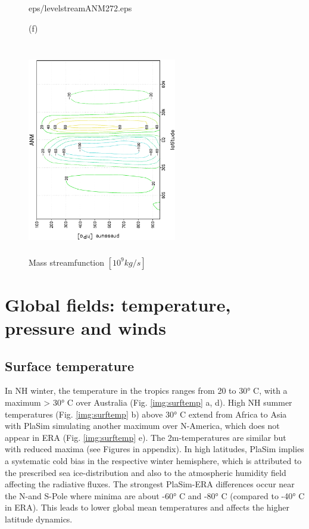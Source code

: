 \documentclass[12pt,a4paper,twoside,openright,headinclude,liststotoc,bibtotoc]{scrreprt}
\begin{document}
\begin{figure}[H]
{{eps/levelstreamANM272.eps}
}
\parbox{8.5cm}{\hspace{1.05cm}\begin{scriptsize}(f)\end{scriptsize} \vspace{-0.5cm} \\
\includegraphics[height=8.5cm,width=6.5cm,angle=-90]
{eps/t21levelstreamANM272.eps}
}
\caption[Mass streamfunction]{Mass streamfunction $[10^{9}kg/s]$}
\label{img:streamfct}
\end{figure}


\vspace{-0.4cm}
\chapter{Global fields: temperature, pressure and winds}
\vspace{-0.4cm}

\section{Surface temperature}
\vspace{-0.4cm}

In NH winter, the temperature in the tropics ranges from 20 to 30° C, with a maximum > 30° C over Australia (Fig. \ref{img:surftemp} a, d). High NH summer temperatures (Fig. \ref{img:surftemp} b) above 30° C extend from Africa to Asia with PlaSim simulating another maximum over N-America, which does not appear in ERA (Fig. \ref{img:surftemp} e). The 2m-temperatures are similar but with reduced maxima (see Figures in appendix). In high latitudes, PlaSim implies a systematic cold bias in the respective winter hemisphere, which is attributed to the prescribed sea ice-distribution and also to the atmospheric humidity field affecting the radiative fluxes. The strongest PlaSim-ERA differences occur near the N-and S-Pole where minima are about -60° C and -80° C (compared to -40° C in ERA). This leads to lower global mean temperatures and affects the higher latitude dynamics. 
\end{document}
